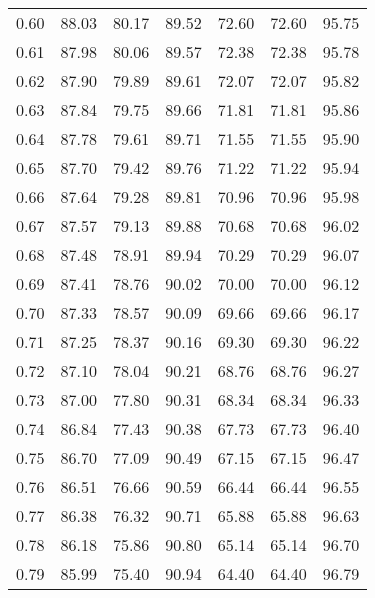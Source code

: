 \begin{tabular}{|c|c|c|c|c|c|c|}
      0.60 &     88.03 &     80.17 &      89.52 &   72.60 &      72.60 &         95.75 \\
      0.61 &     87.98 &     80.06 &      89.57 &   72.38 &      72.38 &         95.78 \\
      0.62 &     87.90 &     79.89 &      89.61 &   72.07 &      72.07 &         95.82 \\
      0.63 &     87.84 &     79.75 &      89.66 &   71.81 &      71.81 &         95.86 \\
      0.64 &     87.78 &     79.61 &      89.71 &   71.55 &      71.55 &         95.90 \\
      0.65 &     87.70 &     79.42 &      89.76 &   71.22 &      71.22 &         95.94 \\
      0.66 &     87.64 &     79.28 &      89.81 &   70.96 &      70.96 &         95.98 \\
      0.67 &     87.57 &     79.13 &      89.88 &   70.68 &      70.68 &         96.02 \\
      0.68 &     87.48 &     78.91 &      89.94 &   70.29 &      70.29 &         96.07 \\
      0.69 &     87.41 &     78.76 &      90.02 &   70.00 &      70.00 &         96.12 \\
      0.70 &     87.33 &     78.57 &      90.09 &   69.66 &      69.66 &         96.17 \\
      0.71 &     87.25 &     78.37 &      90.16 &   69.30 &      69.30 &         96.22 \\
      0.72 &     87.10 &     78.04 &      90.21 &   68.76 &      68.76 &         96.27 \\
      0.73 &     87.00 &     77.80 &      90.31 &   68.34 &      68.34 &         96.33 \\
      0.74 &     86.84 &     77.43 &      90.38 &   67.73 &      67.73 &         96.40 \\
      0.75 &     86.70 &     77.09 &      90.49 &   67.15 &      67.15 &         96.47 \\
      0.76 &     86.51 &     76.66 &      90.59 &   66.44 &      66.44 &         96.55 \\
      0.77 &     86.38 &     76.32 &      90.71 &   65.88 &      65.88 &         96.63 \\
      0.78 &     86.18 &     75.86 &      90.80 &   65.14 &      65.14 &         96.70 \\
      0.79 &     85.99 &     75.40 &      90.94 &   64.40 &      64.40 &         96.79 \\

\end{tabular}
